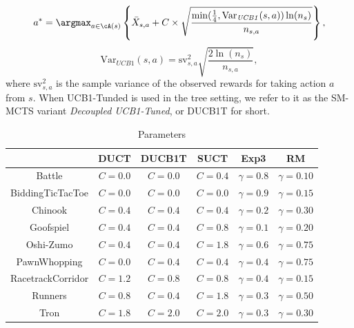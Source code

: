 \begin{equation}
\label{ucb1tuned}
a^* = \argmax_{a \in \cA(s)} \left\{ \bar{X}_{s,a} + C \times \sqrt{\frac{\min(\frac{1}{4},\mathrm{Var}_{\mathit{UCB1}}(s,a)) \ln (n_{s})}{n_{s,a}}} \right\}, 
\end{equation}
\[
\mbox{Var}_{\mathit{UCB1}}(s,a)=\mbox{sv}^2_{s,a}\sqrt{\frac{2 \ln (n_{s})}{n_{s,a}}},
\]
where $\mbox{sv}^2_{s,a}$ is the sample variance of the observed rewards for taking action $a$ from $s$. 
When UCB1-Tunded is used in the tree setting, we refer to it as the SM-MCTS variant {\it Decoupled UCB1-Tuned}, or DUCB1T for short.

\begin{table}[h]
\caption{Parameters}
\label{table:parameters}
\centering
\begin{tabular}{|c|c|c|c|c|c|}
\hline
  & DUCT & DUCB1T & SUCT & Exp3 & RM  \\
\hline
Battle            & $C=0.0$ & $C=0.0$ & $C=0.4$ & $\gamma = 0.8$ & $\gamma = 0.10$  \\ 
BiddingTicTacToe  & $C=0.0$ & $C=0.0$ & $C=0.0$ & $\gamma = 0.9$ & $\gamma = 0.15$   \\ 
Chinook           & $C=0.4$ & $C=0.4$ & $C=0.4$ & $\gamma = 0.2$ & $\gamma = 0.30$ \\ 
Goofspiel         & $C=0.4$ & $C=0.4$ & $C=0.8$ & $\gamma = 0.1$ & $\gamma = 0.20$ \\ 
Oshi-Zumo         & $C=0.4$ & $C=0.4$ & $C=1.8$ & $\gamma = 0.6$ & $\gamma = 0.75$ \\ 
PawnWhopping      & $C=0.0$ & $C=0.4$ & $C=0.4$ & $\gamma = 0.4$ & $\gamma = 0.75$  \\ 
RacetrackCorridor & $C=1.2$ & $C=0.8$ & $C=0.8$ & $\gamma = 0.4$ & $\gamma = 0.15$\\ 
Runners           & $C=0.8$ & $C=0.4$ & $C=1.8$ & $\gamma = 0.3$ & $\gamma = 0.50$ \\
Tron              & $C=1.8$ & $C=2.0$ & $C=2.0$ & $\gamma = 0.3$ & $\gamma = 0.30$ \\
 \hline
\end{tabular}
\end{table}


